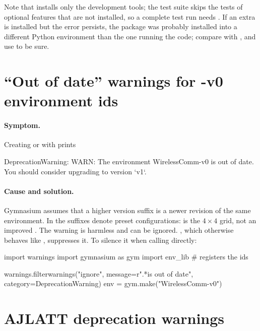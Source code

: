 Note that  installs only the development tools; the
test suite skips the tests of optional features that are not installed, so a
complete test run needs . If an extra is installed but the
error persists, the package was probably installed into a different Python
environment than the one running the code; compare  with
, and use  to be sure.

\section{``Out of date'' warnings for -v0 environment ids}\label{sec:trouble-outofdate}

\paragraph{Symptom.} Creating  or
 with  prints

\begin{textcode}
DeprecationWarning: WARN: The environment WirelessComm-v0 is out of date.
You should consider upgrading to version `v1`.
\end{textcode}

\paragraph{Cause and solution.} Gymnasium assumes that a higher version
suffix is a newer revision of the same environment. In  the
suffixes denote preset configurations:  is the
$4 \times 4$ grid, not an improved . The warning is
harmless and can be ignored. , which otherwise behaves
like , suppresses it. To silence it when calling
 directly:

\begin{pycode}
import warnings
import gymnasium as gym
import env_lib  # registers the ids

warnings.filterwarnings("ignore", message=r".*is out of date",
                        category=DeprecationWarning)
env = gym.make("WirelessComm-v0")
\end{pycode}

\section{AJLATT deprecation warnings}\label{sec:trouble-ajlatt}

